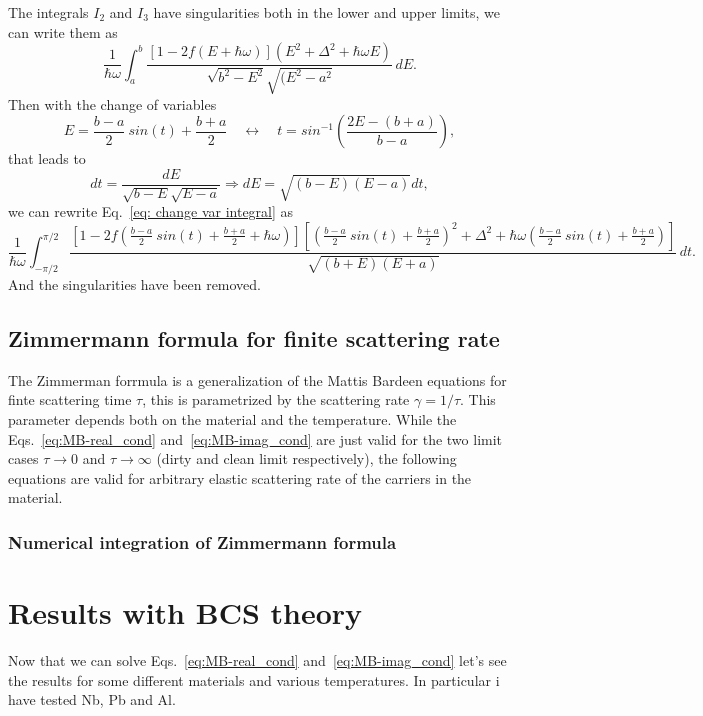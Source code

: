 \documentclass[a4paper,11pt]{book}
\begin{document}
The integrals $I_2$ and $I_3$ have singularities both in the lower and upper limits, we can write them as
\begin{equation}
    \frac{1}{\hbar\omega} \int_{a}^{b} \frac{\left[ 1 - 2f(E + \hbar\omega) \right] \left( E^2 + \Delta^2 + \hbar\omega E \right)}{\sqrt{b^2 - E^2} \sqrt{(E^2 - a^2}} \, dE.
    \label{eq: change var integral}
\end{equation}
Then with the change of variables
\[
    E = \frac{b-a}{2}~sin(t) + \frac{b+a}{2} \quad \leftrightarrow \quad t = sin^{-1}\left(\frac{2E - (b+a)}{b-a}\right),
\]
that leads to 
\[
    dt = \frac{dE}{\sqrt{b - E}\sqrt{E - a}} \Rightarrow dE = \sqrt{(b - E)(E - a)} dt,
\]
we can rewrite Eq.~\ref{eq: change var integral} as
\begin{equation}
    \frac{1}{\hbar\omega} \int_{-\pi/2}^{\pi/2} \frac{\left[ 1 - 2f\left(\frac{b-a}{2}~sin(t) + \frac{b+a}{2} + \hbar\omega\right) \right] \left[ \left(\frac{b-a}{2}~sin(t) + \frac{b+a}{2}\right)^2 + \Delta^2 + \hbar\omega \left(\frac{b-a}{2}~sin(t) + \frac{b+a}{2}\right) \right]}{\sqrt{(b + E)(E + a)}} \, dt.
\end{equation}
And the singularities have been removed.

\section{Zimmermann formula for finite scattering rate}

The Zimmerman forrmula is a generalization of the Mattis Bardeen equations for finte scattering time $\tau$, this is 
parametrized by the scattering rate $\gamma = 1/\tau$. This parameter depends both on the material and the temperature.
While the Eqs.~\ref{eq:MB-real_cond} and~\ref{eq:MB-imag_cond} are just valid for the two limit cases $\tau \rightarrow 0$ and $\tau \rightarrow \infty$ (dirty and clean limit respectively),
the following equations are valid for arbitrary elastic scattering rate of the carriers in the material.

\subsection{Numerical integration of Zimmermann formula}


\chapter{Results with BCS theory}
Now that we can solve Eqs.~\ref{eq:MB-real_cond} and~\ref{eq:MB-imag_cond} let's see the results for some 
different materials and various temperatures. In particular i have tested Nb, Pb and Al.
\end{document}
